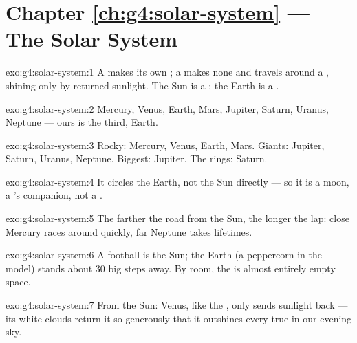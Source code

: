 \section*{Chapter \ref{ch:g4:solar-system} --- The Solar System}

\begin{solution}{exo:g4:solar-system:1}
A  makes its own ; a  makes none and travels around
a , shining only by returned sunlight. The Sun is a ; the
Earth is a .
\end{solution}

\begin{solution}{exo:g4:solar-system:2}
Mercury, Venus, Earth, Mars, Jupiter, Saturn, Uranus, Neptune ---
ours is the third, Earth.
\end{solution}

\begin{solution}{exo:g4:solar-system:3}
Rocky: Mercury, Venus, Earth, Mars. Giants: Jupiter, Saturn,
Uranus, Neptune. Biggest: Jupiter. The rings: Saturn.
\end{solution}

\begin{solution}{exo:g4:solar-system:4}
It circles the Earth, not the Sun directly --- so it is a moon, a
's companion, not a .
\end{solution}

\begin{solution}{exo:g4:solar-system:5}
The farther the road from the Sun, the longer the lap: close
Mercury races around quickly, far Neptune takes lifetimes.
\end{solution}

\begin{solution}{exo:g4:solar-system:6}
A football is the Sun; the Earth (a peppercorn in the model)
stands about $30$ big steps away. By room, the  is almost entirely empty
space.
\end{solution}

\begin{solution}{exo:g4:solar-system:7}
From the Sun: Venus, like the , only sends sunlight back --- its
white clouds return it so generously that it outshines every true
 in our evening sky.
\end{solution}

